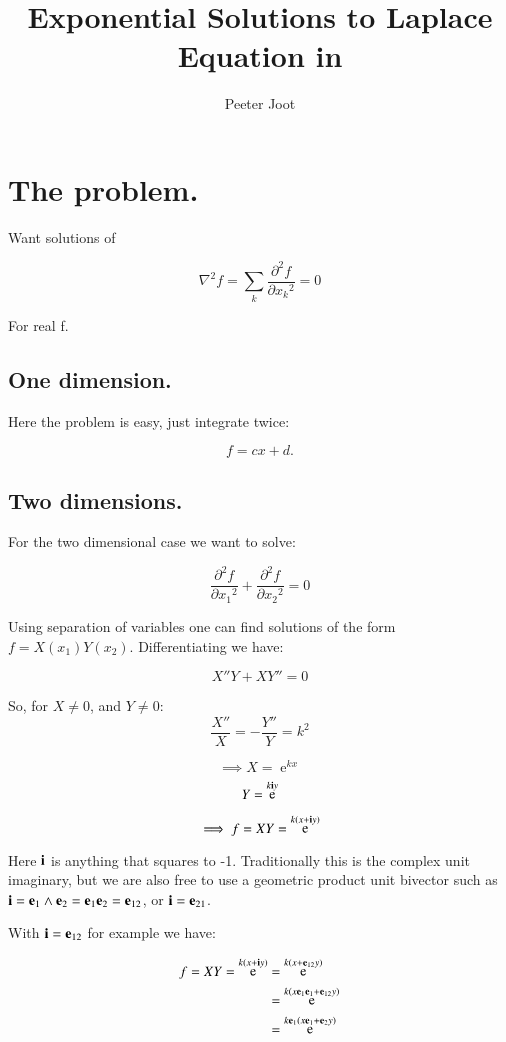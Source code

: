 \documentclass{article}      %
\title{Exponential Solutions to Laplace Equation in \R{N}}
\author{Peeter Joot}         %
\newcommand{\laplacian}[0]{\nabla^2}
\newcommand{\dsqxj}[2] {\frac {\partial^2 {#1}} {\partial {x_{#2}}^2}}
\DeclareMathOperator{\Exp}{e}
\begin{document}

\maketitle{}

\section{ The problem. }

Want solutions of

\begin{equation}\label{eqn:laplacian}
\laplacian f = \sum_k \dsqxj{f}{k} = 0
\end{equation}

For real f.

\subsection{ One dimension. }

Here the problem is easy, just integrate twice:

\[
f = cx + d.
\]

\subsection{ Two dimensions. }

For the two dimensional case we want to solve:

\[
\dsqxj{f}{1} + \dsqxj{f}{2} = 0
\]

Using separation of variables one can find solutions of the form $f = X(x_1)Y(x_2)$.  Differentiating we have:

\[
X''Y + XY'' = 0
\]

So, for $X \ne 0$, and $Y \ne 0$:
\[
\frac{X''}{X} = -\frac{Y''}{Y} = k^2
\]

\[
\implies
X = \Exp^{kx}
\]
\[
Y = \Exp^{k\Bi y}
\]

\[
\implies
f = XY = \Exp^{k(x + \Bi y)}
\]

Here $\mathbf{i}$ is anything that squares to -1.  Traditionally this is the
complex unit imaginary, but we are also free to use a geometric product unit bivector such as $\mathbf{i} = \mathbf{e}_1 \wedge \mathbf{e}_2 = \mathbf{e}_1\mathbf{e}_2 = \mathbf{e}_{12}$, or $\mathbf{i} = \mathbf{e}_{21}$.

With $\mathbf{i} = \mathbf{e}_{12}$ for example we have:

\begin{align*}
f = XY = \Exp^{k(x + \Bi y)}
&= \Exp^{k(x + \Be_{12} y)} \\
&= \Exp^{k(x\Be_{1}\Be_1 + \Be_{12} y)} \\
&= \Exp^{k\Be_1(x\Be_1 + \Be_2 y)} \\
\end{align*}
\end{document}
